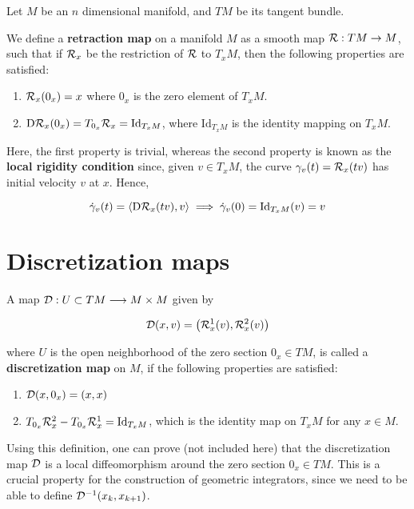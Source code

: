 Let $M$ be an $n$ dimensional manifold, and $TM$ be its tangent bundle.

\begin{defn} 
\label{defn:retraction}
We define a \textbf{retraction map} on a manifold $M$ as a smooth map $\mathcal{R}: TM \to M$, such that if $\mathcal{R}_x$ be the restriction of $\mathcal{R}$ to $T_x M$, then the following properties are satisfied:

    \begin{enumerate}
        \item $\mathcal{R}_x (0_x) = x$ where $0_x$ is the zero element of $T_x M$.
        \item $\text{D}\mathcal{R}_x (0_x ) = T_{0_x} \mathcal{R}_x = \text{Id}_{T_x M} $, where $\text{Id}_{T_x M}$ is the identity mapping on $T_x M$.
    \end{enumerate}
\end{defn}

Here, the first property is trivial, whereas the second property is known as the \textbf{local rigidity condition} since, given $v \in T_x M$, the curve $\gamma_v(t) = \mathcal{R}_x(tv)$ has initial velocity $v$ at $x$. Hence,

\[
  \dot{\gamma}_v (t) = \langle \text{D}\mathcal{R}_x (tv) , v \rangle \implies \dot{\gamma}_v (0) = \text{Id}_{T_x M}(v) = v
\]

\section{Discretization maps}

\begin{defn}
A map $\mathcal{D} : U \subset TM \longrightarrow M \times M$ given by 

\[
  \mathcal{D} (x,v) = \left( \mathcal{R}^1_x(v), \mathcal{R}^2_x(v) \right)
\]

where $U$ is the open neighborhood of the zero section $0_x \in TM$, is called a \textbf{discretization map} on $M$, if the following properties are satisfied:

\begin{enumerate}
  \item $\mathcal{D}(x,0_x) = (x,x)$ 
  \item $T_{0_x}\mathcal{R}_x^2 - T_{0_x}\mathcal{R}_x^1 = \text{Id}_{T_x M}$, which is the identity map on $T_x M$ for any $x \in M$.
\end{enumerate}
\end{defn}

Using this definition, one can prove (not included here) that the discretization map $\mathcal{D}$ is a local diffeomorphism around the zero section $0_x \in TM$. This is a crucial property for the construction of geometric integrators, since we need to be able to define $\mathcal{D}^{-1} (x_k, x_{k+1})$.

